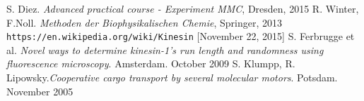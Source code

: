 \begin{thebibliography}{99}
 S. Diez. \textit{Advanced practical course - Experiment MMC}, Dresden, 2015
 R. Winter, F.Noll. \textit{Methoden der Biophysikalischen Chemie}, Springer, 2013
 \texttt{https://en.wikipedia.org/wiki/Kinesin} [November 22, 2015]
 S. Ferbrugge et al. \textit{Novel ways to determine kinesin-1's run length and randomness using fluorescence microscopy}. Amsterdam. October 2009
 S. Klumpp, R. Lipowsky.\textit{Cooperative cargo transport by several molecular motors}. Potsdam. November 2005
\end{thebibliography}